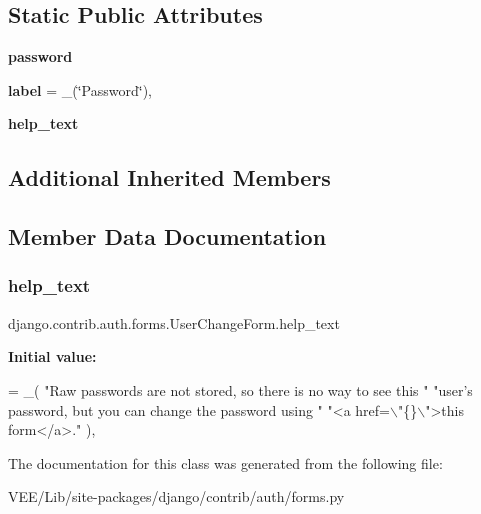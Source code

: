 \subsection*{Static Public Attributes}
\begin{DoxyCompactItemize}
\item 
\mbox{\label{classdjango_1_1contrib_1_1auth_1_1forms_1_1_user_change_form_ae6f5fba3d0f2913af3929ca7d8bc4057}} 
{\bfseries password}
\item 
\mbox{\label{classdjango_1_1contrib_1_1auth_1_1forms_1_1_user_change_form_a318a2a3dd59130c00dee827290dc0dd1}} 
{\bfseries label} = \+\_\+(\char`\"{}Password\char`\"{}),
\item 
{\bfseries help\+\_\+text}
\end{DoxyCompactItemize}
\subsection*{Additional Inherited Members}


\subsection{Member Data Documentation}
\mbox{\label{classdjango_1_1contrib_1_1auth_1_1forms_1_1_user_change_form_abbe36fd23f4ceb9cfaa6514382bcc81f}} 
\subsubsection{\texorpdfstring{help\+\_\+text}{help\_text}}
{\footnotesize\ttfamily django.\+contrib.\+auth.\+forms.\+User\+Change\+Form.\+help\+\_\+text\hspace{0.3cm}{\ttfamily [static]}}

{\bfseries Initial value\+:}
\begin{DoxyCode}
= \_(
            \textcolor{stringliteral}{"Raw passwords are not stored, so there is no way to see this "}
            \textcolor{stringliteral}{"user's password, but you can change the password using "}
            \textcolor{stringliteral}{"<a href=\(\backslash\)"\{\}\(\backslash\)">this form</a>."}
        ),
\end{DoxyCode}


The documentation for this class was generated from the following file\+:\begin{DoxyCompactItemize}
\item 
V\+E\+E/\+Lib/site-\/packages/django/contrib/auth/forms.\+py\end{DoxyCompactItemize}
